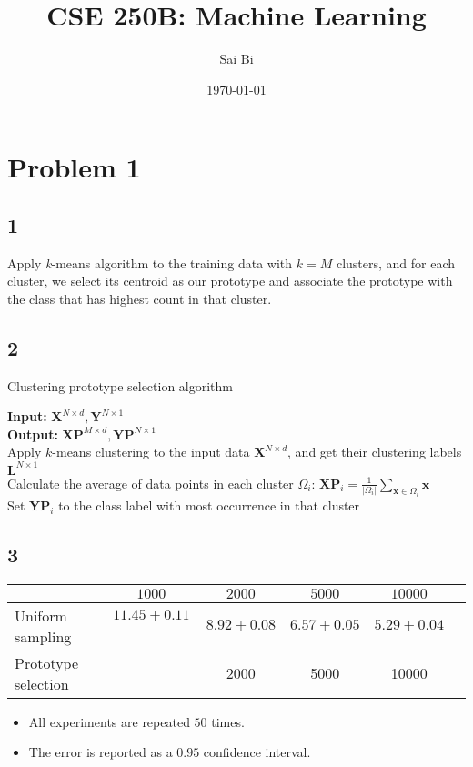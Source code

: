 \documentclass[a4paper,11pt]{article}
\theoremstyle{mytheor}
\begin{document}
\title{CSE 250B: Machine Learning}

\author{Sai Bi}

\date{\today}

\maketitle

\section*{Problem 1}
\subsection*{1} 
Apply \textit{k}-means algorithm to the training data with $k = M$ clusters, and for each cluster, we select its 
centroid as our prototype and associate the prototype with the class that has highest count in that cluster.

\subsection*{2}
{\LinesNumberedHidden
\begin{algorithm}[H]
	\DontPrintSemicolon
	\SetAlgoNoLine
	
	\caption{Clustering prototype selection algorithm}
	\textbf{Input: }{$\mathbf{X}^{N \times d}, \mathbf{Y}^{N \times 1}$} \\
	\textbf{Output: }{$\mathbf{XP}^{M \times d}, \mathbf{YP}^{N \times 1}$} \\
	Apply $k$-means clustering to the input data $\mathbf{X}^{N \times d}$, and get their clustering labels $\mathbf{L}^{N \times 1}$ \\
	Calculate the average of data points in each cluster $\Omega_i$: $\mathbf{XP}_i = \frac{1}{|\Omega_i|} \sum\limits_{\mathbf{x} \in \Omega_i}{\mathbf{x}}$ \\
	Set $\mathbf{YP}_i$ to the class label with most occurrence in that cluster
\end{algorithm}
}

\subsection*{3}
\begin{tabular}{|l|c|c|c|c|c|}
	\hline
		&  $1000$ & $2000$ & $5000$ & $10000$  \\ \hline
	Uniform sampling &  $11.45 \pm 0.11$ \ & $8.92 \pm 0.08 $ & $6.57 \pm 0.05 $ & $5.29 \pm 0.04$  \\ \hline 
	Prototype selection &   & 2000 & 5000 & 10000  \\ \hline 
\end{tabular}

\begin{itemize}
	\item All experiments are repeated $50$ times.
	\item The error is reported as a $0.95$ confidence interval.
\end{itemize}
\end{document}
